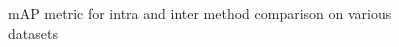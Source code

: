 \begin{figure}[H]
\begin{minipage}[!h]{0.6\linewidth}
            \end{minipage}
        \caption{mAP metric for intra and inter method comparison on various datasets}
        \label{fig:}
        \end{figure}
        \FloatBarrier